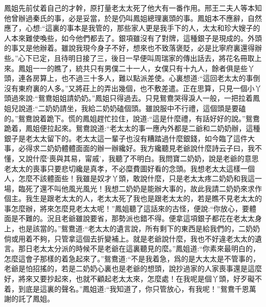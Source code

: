\begin{parag}
    鳳姐先前仗着自己的才幹，原打量老太太死了他大有一番作用。邢王二夫人等本知他曾辦過秦氏的事，必是妥當，於是仍叫鳳姐總理裏頭的事。鳳姐本不應辭，自然應了，心想:“這裏的事本是我管的，那些家人更是我手下的人，太太和珍大嫂子的人本來難使喚些，如今他們都去了。銀項雖沒有了對牌，這種銀子是現成的。外頭的事又是他辦着。雖說我現今身子不好，想來也不致落褒貶，必是比寧府裏還得辦些。”心下已定，且待明日接了三，後日一早便叫周瑞家的傳出話去，將花名冊取上來。鳳姐一一的瞧了，統共只有男僕二十一人，女僕只有十九人，餘者俱是些丫頭，連各房算上，也不過三十多人，難以點派差使。心裏想道:“這回老太太的事倒沒有東府裏的人多。”又將莊上的弄出幾個，也不敷差遣。正在思算，只見一個小丫頭過來說:“鴛鴦姐姐請奶奶。”鳳姐只得過去。只見鴛鴦哭得淚人一般，一把拉着鳳姐兒說道:“二奶奶請坐，我給二奶奶磕個頭。雖說服中不行禮，這個頭是要磕的。”鴛鴦說着跪下。慌的鳳姐趕忙拉住，說道:“這是什麼禮，有話好好的說。”鴛鴦跪着，鳳姐便拉起來。鴛鴦說道:“老太太的事一應內外都是二爺和二奶奶辦，這種銀子是老太太留下的。老太太這一輩子也沒有糟踏過什麼銀錢，如今臨了這件大事，必得求二奶奶體體面面的辦一辦纔好。我方纔聽見老爺說什麼詩云子曰，我不懂，又說什麼‘喪與其易，甯戚’，我聽了不明白。我問寶二奶奶，說是老爺的意思老太太的喪事只要悲切纔是真孝，不必糜費圖好看的念頭。我想老太太這樣一個人，怎麼不該體面些！我雖是奴才丫頭，敢說什麼，只是老太太疼二奶奶和我這一場，臨死了還不叫他風光風光！我想二奶奶是能辦大事的，故此我請二奶奶來求作個主。我生是跟老太太的人，老太太死了我也是跟老太太的，若是瞧不見老太太的事怎麼辦，將來怎麼見老太太呢！”鳳姐聽了這話來的古怪，便說:“你放心，要體面是不難的。況且老爺雖說要省，那勢派也錯不得。便拿這項銀子都花在老太太身上，也是該當的。”鴛鴦道:“老太太的遺言說，所有剩下的東西是給我們的，二奶奶倘或用着不夠，只管拿這個去折變補上。就是老爺說什麼，我也不好違老太太的遺言。那日老太太分派的時候不是老爺在這裏聽見的麼。”鳳姐道:“你素來最明白的，怎麼這會子那樣的着急起來了。”鴛鴦道:“不是我着急，爲的是大太太是不管事的，老爺是怕招搖的，若是二奶奶心裏也是老爺的想頭，說抄過家的人家喪事還是這麼好，將來又要抄起來，也就不顧起老太太來，怎麼處！在我呢是個丫頭，好歹礙不着，到底是這裏的聲名。”鳳姐道:“我知道了，你只管放心，有我呢！”鴛鴦千恩萬謝的託了鳳姐。
\end{parag}


